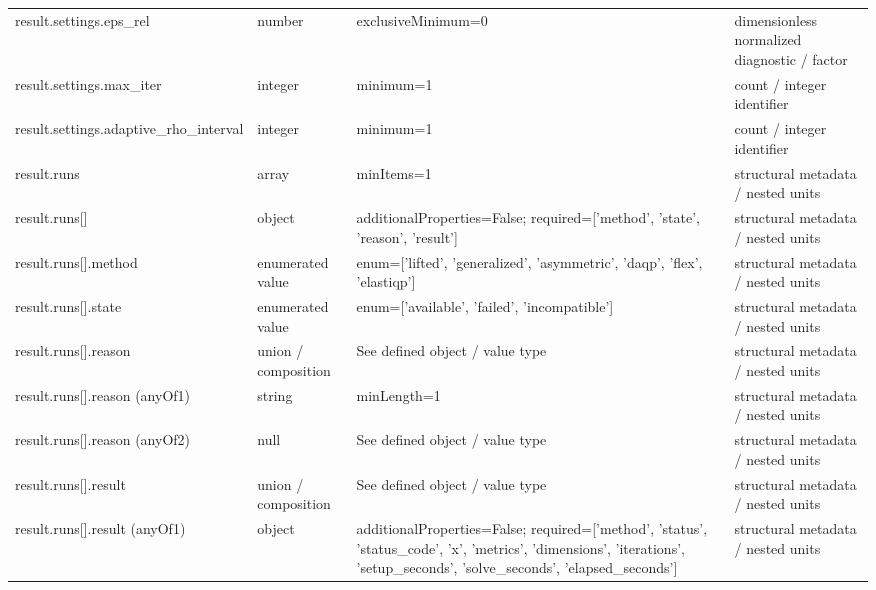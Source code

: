 \begin{longtable}{@{}>{\raggedright\arraybackslash}p{}>{\raggedright\arraybackslash}p{}>{\raggedright\arraybackslash}p{}>{\raggedright\arraybackslash}p{}@{}}
result.\allowbreak{}settings.\allowbreak{}eps\_\allowbreak{}rel & number & exclusiveMinimum=\allowbreak{}0 & dimensionless normalized diagnostic /\allowbreak{} factor\\
result.\allowbreak{}settings.\allowbreak{}max\_\allowbreak{}iter & integer & minimum=\allowbreak{}1 & count /\allowbreak{} integer identifier\\
result.\allowbreak{}settings.\allowbreak{}adaptive\_\allowbreak{}rho\_\allowbreak{}interval & integer & minimum=\allowbreak{}1 & count /\allowbreak{} integer identifier\\
result.\allowbreak{}runs & array & minItems=\allowbreak{}1 & structural metadata /\allowbreak{} nested units\\
result.\allowbreak{}runs[] & object & additionalProperties=\allowbreak{}False; required=\allowbreak{}['method', 'state', 'reason', 'result'] & structural metadata /\allowbreak{} nested units\\
result.\allowbreak{}runs[].\allowbreak{}method & enumerated value & enum=\allowbreak{}['lifted', 'generalized', 'asymmetric', 'daqp', 'flex', 'elastiqp'] & structural metadata /\allowbreak{} nested units\\
result.\allowbreak{}runs[].\allowbreak{}state & enumerated value & enum=\allowbreak{}['available', 'failed', 'incompatible'] & structural metadata /\allowbreak{} nested units\\
result.\allowbreak{}runs[].\allowbreak{}reason & union /\allowbreak{} composition & See defined object /\allowbreak{} value type & structural metadata /\allowbreak{} nested units\\
result.\allowbreak{}runs[].\allowbreak{}reason (anyOf1) & string & minLength=\allowbreak{}1 & structural metadata /\allowbreak{} nested units\\
result.\allowbreak{}runs[].\allowbreak{}reason (anyOf2) & null & See defined object /\allowbreak{} value type & structural metadata /\allowbreak{} nested units\\
result.\allowbreak{}runs[].\allowbreak{}result & union /\allowbreak{} composition & See defined object /\allowbreak{} value type & structural metadata /\allowbreak{} nested units\\
result.\allowbreak{}runs[].\allowbreak{}result (anyOf1) & object & additionalProperties=\allowbreak{}False; required=\allowbreak{}['method', 'status', 'status\_\allowbreak{}code', 'x', 'metrics', 'dimensions', 'iterations', 'setup\_\allowbreak{}seconds', 'solve\_\allowbreak{}seconds', 'elapsed\_\allowbreak{}seconds'] & structural metadata /\allowbreak{} nested units\\

\end{longtable}
